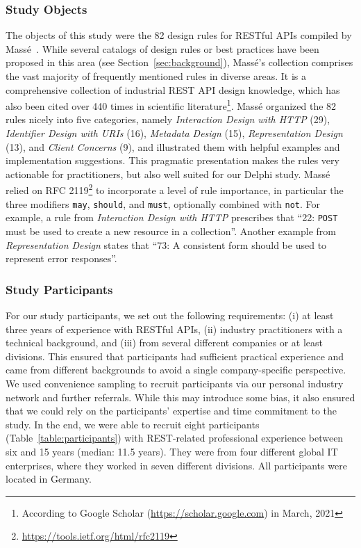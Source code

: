 \documentclass[runningheads]{llncs}
\begin{document}
\subsubsection{Study Objects}
The objects of this study were the 82 design rules for RESTful APIs compiled by Massé~\cite{book:RestApiDesignRulebook2011}.
While several catalogs of design rules or best practices have been proposed in this area (see Section~\ref{sec:background}), Massé's collection comprises the vast majority of frequently mentioned rules in diverse areas.
It is a comprehensive collection of industrial REST API design knowledge, which has also been cited over 440 times in scientific literature\footnote{According to Google Scholar (\url{https://scholar.google.com}) in March, 2021}.
Massé organized the 82 rules nicely into five categories, namely \textit{Interaction Design with HTTP} (29), \textit{Identifier Design with URIs} (16), \textit{Metadata Design} (15), \textit{Representation Design} (13), and \textit{Client Concerns} (9), and illustrated them with helpful examples and implementation suggestions.
This pragmatic presentation makes the rules very actionable for practitioners, but also well suited for our Delphi study.
Massé relied on RFC 2119\footnote{\url{https://tools.ietf.org/html/rfc2119}} to incorporate a level of rule importance, in particular the three modifiers \texttt{may}, \texttt{should}, and \texttt{must}, optionally combined with \texttt{not}.
For example, a rule from \textit{Interaction Design with HTTP} prescribes that \enquote{22: \texttt{POST} must be used to create a new resource in a collection}.
Another example from \textit{Representation Design} states that \enquote{73: A consistent form should be used to represent error responses}.

\subsubsection{Study Participants}
For our study participants, we set out the following requirements:
(i) at least three years of experience with RESTful APIs, (ii) industry practitioners with a technical background, and (iii) from several different companies or at least divisions.
This ensured that participants had sufficient practical experience and came from different backgrounds to avoid a single company-specific perspective.
We used convenience sampling to recruit participants via our personal industry network and further referrals.
While this may introduce some bias, it also ensured that we could rely on the participants' expertise and time commitment to the study.
In the end, we were able to recruit eight participants (Table~\ref{table:participants}) with REST-related professional experience between six and 15 years (median: 11.5 years).
They were from four different global IT enterprises, where they worked in seven different divisions.
All participants were located in Germany.
\end{document}
